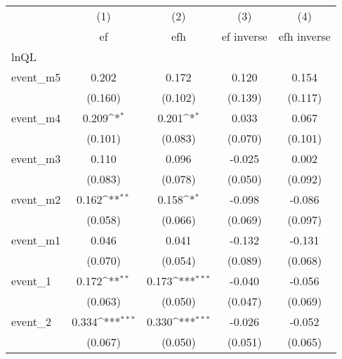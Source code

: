 {
\def\sym#1{\ifmmode^{#1}\else\(^{#1}\)\fi}
\begin{tabular}{l*{4}{c}}
\hline\hline
            &\multicolumn{1}{c}{(1)}&\multicolumn{1}{c}{(2)}&\multicolumn{1}{c}{(3)}&\multicolumn{1}{c}{(4)}\\
            &\multicolumn{1}{c}{ef}&\multicolumn{1}{c}{efh}&\multicolumn{1}{c}{ef inverse}&\multicolumn{1}{c}{efh inverse}\\
\hline
lnQL        &                     &                     &                     &                     \\
event\_m5    &       0.202         &       0.172         &       0.120         &       0.154         \\
            &     (0.160)         &     (0.102)         &     (0.139)         &     (0.117)         \\
[1em]
event\_m4    &       0.209\sym{*}  &       0.201\sym{*}  &       0.033         &       0.067         \\
            &     (0.101)         &     (0.083)         &     (0.070)         &     (0.101)         \\
[1em]
event\_m3    &       0.110         &       0.096         &      -0.025         &       0.002         \\
            &     (0.083)         &     (0.078)         &     (0.050)         &     (0.092)         \\
[1em]
event\_m2    &       0.162\sym{**} &       0.158\sym{*}  &      -0.098         &      -0.086         \\
            &     (0.058)         &     (0.066)         &     (0.069)         &     (0.097)         \\
[1em]
event\_m1    &       0.046         &       0.041         &      -0.132         &      -0.131         \\
            &     (0.070)         &     (0.054)         &     (0.089)         &     (0.068)         \\
[1em]
event\_1     &       0.172\sym{**} &       0.173\sym{***}&      -0.040         &      -0.056         \\
            &     (0.063)         &     (0.050)         &     (0.047)         &     (0.069)         \\
[1em]
event\_2     &       0.334\sym{***}&       0.330\sym{***}&      -0.026         &      -0.052         \\
            &     (0.067)         &     (0.050)         &     (0.051)         &     (0.065)         \\

\end{tabular}}
